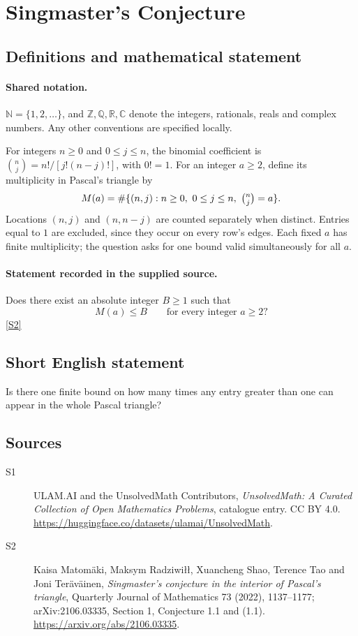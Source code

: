 \documentclass[11pt]{article}
\newcommand{\sref}[2]{\hyperlink{source:#1:#2}{[S#2]}}
\begin{document}
\section{Singmaster's Conjecture}\label{statement}

\subsection{Definitions and mathematical statement}

\paragraph{Shared notation.}$\mathbb N=\{1,2,\ldots\}$, and $\mathbb Z,\mathbb Q,\mathbb R,\mathbb C$ denote the integers, rationals, reals and complex numbers. Any other conventions are specified locally.


For integers \(n\ge0\) and \(0\le j\le n\), the binomial
coefficient is \(\binom nj=n!/[j!(n-j)!]\), with \(0!=1\).
For an integer \(a\ge2\), define its multiplicity in Pascal's triangle by
\[
 M(a)=\#\{(n,j):n\ge0,\ 0\le j\le n,\ \tbinom nj=a\}.
\]
Locations \((n,j)\) and \((n,n-j)\) are counted separately when distinct.
Entries equal to \(1\) are excluded, since they occur on every row's edges.
Each fixed \(a\) has finite multiplicity; the question asks for one
bound valid simultaneously for all \(a\).
\paragraph{Statement recorded in the supplied source.}
Does there exist an absolute integer \(B\ge1\) such that
\[
                     M(a)\le B\qquad\text{for every integer }a\ge2?
\] \sref{statement}{2}
\subsection{Short English statement}
Is there one finite bound on how many times any entry greater than one can appear in the whole Pascal triangle?
\subsection{Sources}
\begin{description}
\item[\hypertarget{source:statement:1}{S1}] ULAM.AI and the UnsolvedMath Contributors, \emph{UnsolvedMath: A Curated Collection of Open Mathematics Problems}, catalogue entry. CC BY 4.0. \url{https://huggingface.co/datasets/ulamai/UnsolvedMath}.
\item[\hypertarget{source:statement:2}{S2}] Kaisa Matom\"aki, Maksym Radziwi\l\l, Xuancheng Shao, Terence Tao and Joni Ter\"av\"ainen, \emph{Singmaster's conjecture in the interior of Pascal's triangle}, Quarterly Journal of Mathematics 73 (2022), 1137--1177; arXiv:2106.03335, Section 1, Conjecture 1.1 and (1.1). \url{https://arxiv.org/abs/2106.03335}.
\end{description}
\label{end:statement}
\end{document}
